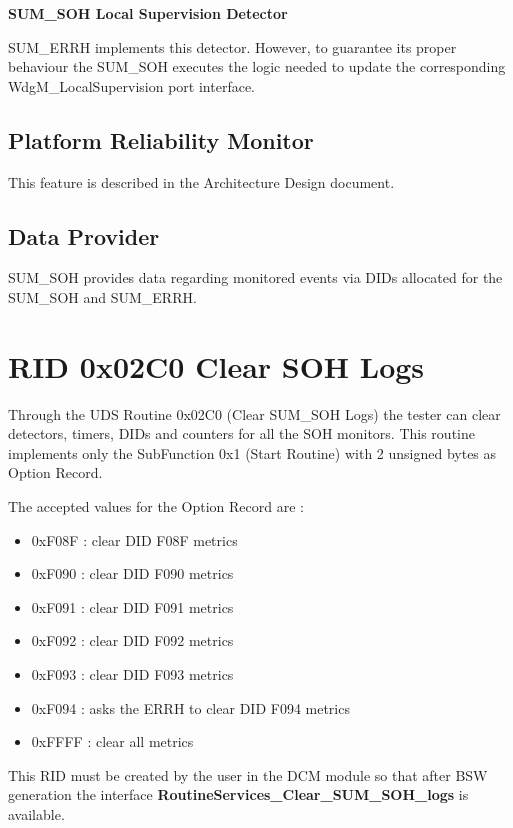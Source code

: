 {
    \textbf{SUM\_SOH Local Supervision Detector}
    
     SUM\_ERRH implements this detector. However, to guarantee its proper behaviour the SUM\_SOH executes the logic needed to update the corresponding WdgM\_LocalSupervision port interface.
    
}
{
}

\subsection{Platform Reliability Monitor}
\label{subsection:PlatformReliabilityMonitor}
This feature is described in the Architecture Design document.

\subsection{Data Provider}
SUM\_SOH  provides data regarding monitored events via DIDs allocated for the SUM\_SOH and SUM\_ERRH.


\section{RID 0x02C0 Clear SOH Logs}

{
Through the UDS Routine 0x02C0 (Clear SUM\_SOH Logs) the tester can clear detectors, timers, DIDs and counters for all the SOH monitors. 
This routine implements only the SubFunction 0x1 (Start Routine) with 2 unsigned bytes as Option Record.

The accepted values for the Option Record are :
\begin{itemize}
\item 0xF08F : clear DID F08F metrics
\item 0xF090 : clear DID F090 metrics
\item 0xF091 : clear DID F091 metrics
\item 0xF092 : clear DID F092 metrics
\item 0xF093 : clear DID F093 metrics
\item 0xF094 : asks the ERRH to clear DID F094 metrics
\item 0xFFFF : clear all metrics
\end{itemize}

This RID must be created by the user in the DCM module so that after BSW generation the interface \textbf{RoutineServices\_Clear\_SUM\_SOH\_logs} is available.
}
{
  
}



